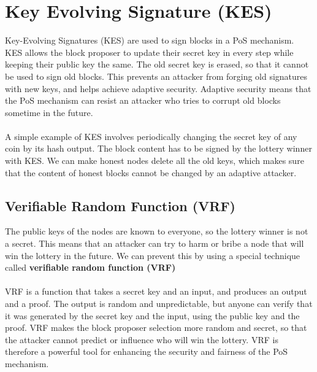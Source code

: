 \section{Key Evolving Signature (KES)}
Key-Evolving Signatures (KES) are used to sign blocks in a PoS mechanism. KES allows the block proposer to update their secret key in every step while keeping their public key the same. The old secret key is erased, so that it cannot be used to sign old blocks. This prevents an attacker from forging old signatures with new keys, and helps achieve adaptive security. Adaptive security means that the PoS mechanism can resist an attacker who tries to corrupt old blocks sometime in the future.\\\\
A simple example of KES involves periodically changing the secret key of any coin by its hash output. The block content has to be signed by the lottery winner with KES. We can make honest nodes delete all the old keys, which makes sure that the content of honest blocks cannot be changed by an adaptive attacker.

\subsection*{Verifiable Random Function (VRF)}
The public keys of the nodes are known to everyone, so the lottery winner is not a secret. This means that an attacker can try to harm or bribe a node that will win the lottery in the future. We can prevent this by using a special technique called \textbf{verifiable random function (VRF)}\\\\
VRF is a function that takes a secret key and an input, and produces an output and a proof. The output is random and unpredictable, but anyone can verify that it was generated by the secret key and the input, using the public key and the proof.
VRF makes the block proposer selection more random and secret, so that the attacker cannot predict or influence who will win the lottery. VRF is therefore a powerful tool for enhancing the security and fairness of the PoS mechanism.

